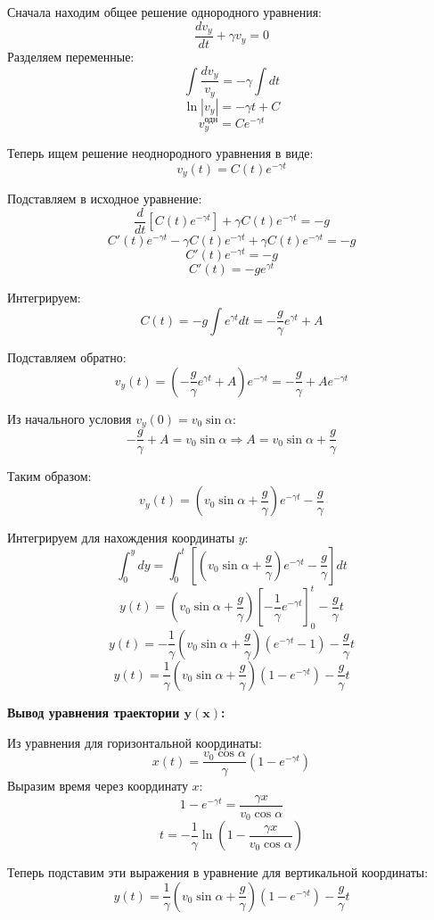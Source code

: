 Сначала находим общее решение однородного уравнения:
\[
\dfrac{dv_y}{dt} + \gamma v_y = 0
\]
Разделяем переменные:
\[
\int \dfrac{dv_y}{v_y} = -\gamma \int dt
\]
\[
\ln|v_y| = -\gamma t + C
\]
\[
v_y^{\text{одн}} = C e^{-\gamma t}
\]

Теперь ищем решение неоднородного уравнения в виде:
\[
v_y(t) = C(t) e^{-\gamma t}
\]

Подставляем в исходное уравнение:
\[
\dfrac{d}{dt}\left[C(t) e^{-\gamma t}\right] + \gamma C(t) e^{-\gamma t} = -g
\]
\[
C'(t) e^{-\gamma t} - \gamma C(t) e^{-\gamma t} + \gamma C(t) e^{-\gamma t} = -g
\]
\[
C'(t) e^{-\gamma t} = -g
\]
\[
C'(t) = -g e^{\gamma t}
\]

Интегрируем:
\[
C(t) = -g \int e^{\gamma t} dt = -\dfrac{g}{\gamma} e^{\gamma t} + A
\]

Подставляем обратно:
\[
v_y(t) = \left(-\dfrac{g}{\gamma} e^{\gamma t} + A\right) e^{-\gamma t} = -\dfrac{g}{\gamma} + A e^{-\gamma t}
\]

Из начального условия $v_y(0) = v_0 \sin\alpha$:
\[
-\dfrac{g}{\gamma} + A = v_0 \sin\alpha \Rightarrow A = v_0 \sin\alpha + \dfrac{g}{\gamma}
\]

Таким образом:
\[
v_y(t) = \left(v_0 \sin\alpha + \dfrac{g}{\gamma}\right)e^{-\gamma t} - \dfrac{g}{\gamma}
\]

Интегрируем для нахождения координаты $y$:
\[
\int_0^y dy = \int_0^t \left[\left(v_0 \sin\alpha + \dfrac{g}{\gamma}\right)e^{-\gamma t} - \dfrac{g}{\gamma}\right] dt
\]
\[
y(t) = \left(v_0 \sin\alpha + \dfrac{g}{\gamma}\right)\left[-\dfrac{1}{\gamma}e^{-\gamma t}\right]_0^t - \dfrac{g}{\gamma}t
\]
\[
y(t) = -\dfrac{1}{\gamma}\left(v_0 \sin\alpha + \dfrac{g}{\gamma}\right)(e^{-\gamma t} - 1) - \dfrac{g}{\gamma}t
\]
\[
y(t) = \dfrac{1}{\gamma}\left(v_0 \sin\alpha + \dfrac{g}{\gamma}\right)(1 - e^{-\gamma t}) - \dfrac{g}{\gamma}t
\]

\vspace{0.5cm}
\textbf{Вывод уравнения траектории $\bm{y(x)}$:}

Из уравнения для горизонтальной координаты:
\[
x(t) = \dfrac{v_0 \cos\alpha}{\gamma}(1 - e^{-\gamma t})
\]
Выразим время через координату $x$:
\[
1 - e^{-\gamma t} = \dfrac{\gamma x}{v_0 \cos\alpha}
\]
\[
t = -\dfrac{1}{\gamma} \ln\left(1 - \dfrac{\gamma x}{v_0 \cos\alpha}\right)
\]

Теперь подставим эти выражения в уравнение для вертикальной координаты:
\[
y(t) = \dfrac{1}{\gamma}\left(v_0 \sin\alpha + \dfrac{g}{\gamma}\right)(1 - e^{-\gamma t}) - \dfrac{g}{\gamma}t
\]

